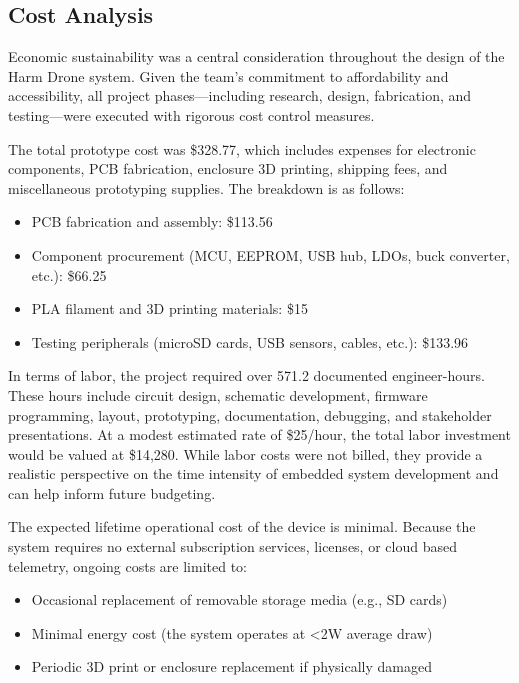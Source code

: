 \documentclass[12pt]{article}
\begin{document}
\subsection{Cost Analysis}

\par Economic sustainability was a central consideration throughout the design of the Harm Drone system. Given the team's commitment to affordability and accessibility, all project phases—including research, design, fabrication, and testing—were executed with rigorous cost control measures.

\par The total prototype cost was \$328.77, which includes expenses for electronic components, PCB fabrication, enclosure 3D printing, shipping fees, and miscellaneous prototyping supplies. The breakdown is as follows:

\begin{itemize}
\item PCB fabrication and assembly: \$113.56
\item Component procurement (MCU, EEPROM, USB hub, LDOs, buck converter, etc.): \$66.25
\item PLA filament and 3D printing materials: \$15
\item Testing peripherals (microSD cards, USB sensors, cables, etc.): \$133.96
\end{itemize}

\par In terms of labor, the project required over 571.2 documented engineer-hours. These hours include circuit design, schematic development, firmware programming, layout, prototyping, documentation, debugging, and stakeholder presentations. At a modest estimated rate of \$25/hour, the total labor investment would be valued at \$14,280. While labor costs were not billed, they provide a realistic perspective on the time intensity of embedded system development and can help inform future budgeting.

\par The expected lifetime operational cost of the device is minimal. Because the system requires no external subscription services, licenses, or cloud based telemetry, ongoing costs are limited to:

\begin{itemize}
\item Occasional replacement of removable storage media (e.g., SD cards)
\item Minimal energy cost (the system operates at \textless 2W average draw)
\item Periodic 3D print or enclosure replacement if physically damaged
\end{itemize}
\end{document}
